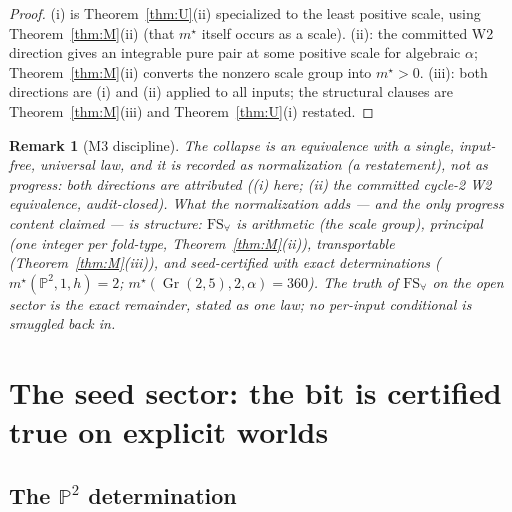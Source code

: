 \documentclass[11pt]{article}
\newtheorem{remark}[theorem]{Remark}
\newcommand{\Pp}{\mathbb{P}}
\newcommand{\Gr}{\operatorname{Gr}}
\newcommand{\FS}{\mathrm{FS}_\forall}
\begin{document}
\begin{proof}
(i) is Theorem~\ref{thm:U}(ii) specialized to the least positive scale,
using Theorem~\ref{thm:M}(ii) (that $m^\star$ itself occurs as a scale).
(ii): the committed W2 direction gives an integrable pure pair at some
positive scale for algebraic $\alpha$; Theorem~\ref{thm:M}(ii) converts the
nonzero scale group into $m^\star>0$.  (iii): both directions are (i) and
(ii) applied to all inputs; the structural clauses are
Theorem~\ref{thm:M}(iii) and Theorem~\ref{thm:U}(i) restated.
\end{proof}

\begin{remark}[M3 discipline]
The collapse is an \emph{equivalence} with a single, input-free, universal
law, and it is recorded as normalization (a restatement), not as progress:
both directions are attributed ((i) here; (ii) the committed cycle-2 W2
equivalence, audit-closed).  What the normalization adds --- and the only
progress content claimed --- is structure: $\FS$ is arithmetic (the scale
group), principal (one integer per fold-type, Theorem~\ref{thm:M}(ii)),
transportable (Theorem~\ref{thm:M}(iii)), and seed-certified with exact
determinations ($m^\star(\Pp^2,1,h)=2$;
$m^\star(\Gr(2,5),2,\alpha)=360$).  The truth of $\FS$ on the open sector
is the exact remainder, stated as one law; no per-input conditional is
smuggled back in.
\end{remark}

\section{The seed sector: the bit is certified true on explicit worlds}
\label{sec:seeds}

\subsection{The \texorpdfstring{$\Pp^2$}{P2} determination}
\end{document}
